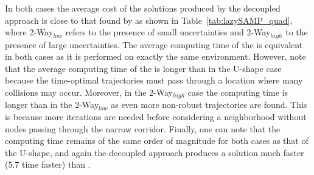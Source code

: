In both cases the average cost of the solutions produced by the decoupled approach is close to that found by  as shown in Table~\ref{tab:lazySAMP_quad}, where 2-Way$_{low}$ refers to the presence of small uncertainties and 2-Way$_{high}$ to the presence of large uncertainties.
The average computing time of the  is equivalent in both cases as it is performed on exactly the same environment.
However, note that the average computing time of the  is longer than in the U-shape case because the time-optimal trajectories must pass through a location where many collisions may occur. 
Moreover, in the 2-Way$_{high}$ case the  computing time is longer than in the 2-Way$_{low}$ as even more non-robust trajectories are found.
This is because more iterations are needed before considering a neighborhood without nodes passing through the narrow corridor.
Finally, one can note that the  computing time remains of the same order of magnitude for both cases as that of the U-shape, and again the decoupled approach produces a solution much faster (5.7 time faster) than .

